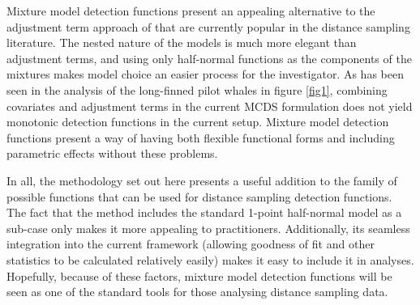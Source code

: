 Mixture model detection functions present an appealing alternative to the adjustment term approach of  that are currently popular in the distance sampling literature. The nested nature of the models is much more elegant than adjustment terms, and using only half-normal functions as the components of the mixtures makes model choice an easier process for the investigator. As has been seen in the analysis of the long-finned pilot whales in figure \ref{fig1}, combining covariates and adjustment terms in the current MCDS formulation does not yield monotonic detection functions in the current setup. Mixture model detection functions present a way of having both flexible functional forms and including parametric effects without these problems.

In all, the methodology set out here presents a useful addition to the family of possible functions that can be used for distance sampling detection functions. The fact that the method includes the standard 1-point half-normal model as a sub-case only makes it more appealing to practitioners. Additionally, its seamless integration into the current framework (allowing goodness of fit and other statistics to be calculated relatively easily) makes it easy to include it in analyses. Hopefully, because of these factors, mixture model detection functions will be seen as one of the standard tools for those analysing distance sampling data.


